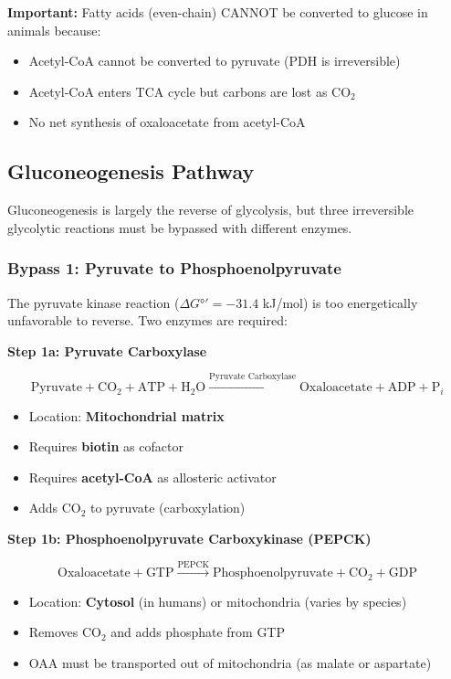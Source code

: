 \begin{theorem}
\textbf{Important:} Fatty acids (even-chain) CANNOT be converted to glucose in animals because:
\begin{itemize}
    \item Acetyl-CoA cannot be converted to pyruvate (PDH is irreversible)
    \item Acetyl-CoA enters TCA cycle but carbons are lost as CO$_2$
    \item No net synthesis of oxaloacetate from acetyl-CoA
\end{itemize}
\end{theorem}

\subsection{Gluconeogenesis Pathway}

Gluconeogenesis is largely the reverse of glycolysis, but three irreversible glycolytic reactions must be bypassed with different enzymes.

\subsubsection{Bypass 1: Pyruvate to Phosphoenolpyruvate}

The pyruvate kinase reaction ($\Delta G°' = -31.4$ kJ/mol) is too energetically unfavorable to reverse. Two enzymes are required:

\textbf{Step 1a: Pyruvate Carboxylase}

\[
\text{Pyruvate} + \text{CO}_2 + \text{ATP} + \text{H}_2\text{O} \xrightarrow{\text{Pyruvate Carboxylase}} \text{Oxaloacetate} + \text{ADP} + \text{P}_i
\]

\begin{itemize}
    \item Location: \textbf{Mitochondrial matrix}
    \item Requires \textbf{biotin} as cofactor
    \item Requires \textbf{acetyl-CoA} as allosteric activator
    \item Adds CO$_2$ to pyruvate (carboxylation)
\end{itemize}

\textbf{Step 1b: Phosphoenolpyruvate Carboxykinase (PEPCK)}

\[
\text{Oxaloacetate} + \text{GTP} \xrightarrow{\text{PEPCK}} \text{Phosphoenolpyruvate} + \text{CO}_2 + \text{GDP}
\]

\begin{itemize}
    \item Location: \textbf{Cytosol} (in humans) or mitochondria (varies by species)
    \item Removes CO$_2$ and adds phosphate from GTP
    \item OAA must be transported out of mitochondria (as malate or aspartate)
\end{itemize}

